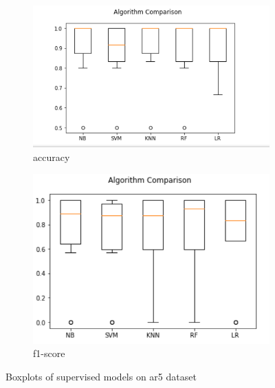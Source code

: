 \begin{figure}[h!]
  \centering
  \begin{subfigure}[b]{0.4\linewidth}
    \includegraphics[width=\linewidth]{report/ar5.png}
    \caption{accuracy}
  \end{subfigure}
  \begin{subfigure}[b]{0.4\linewidth}
    \includegraphics[width=\linewidth]{report/ar5_f.png}
    \caption{f1-score}
  \end{subfigure}
  \caption{Boxplots of supervised models on ar5 dataset}
\end{figure}

